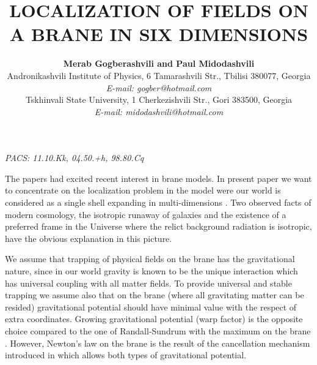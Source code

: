 \documentclass[a4paper,a4paper]{article}
\begin{document}
\title{\large \bf LOCALIZATION OF FIELDS ON A BRANE IN SIX DIMENSIONS}
\author{{\bf Merab Gogberashvili\coordHE{} and Paul Midodashvili\coordHE{}} \\
\coordHE{} Andronikashvili Institute of Physics, 6 Tamarashvili Str.,
Tbilisi 380077, Georgia \\
{\sl E-mail: gogber@hotmail.com }\\
\coordHE{} Tskhinvali State University, 1 Cherkezishvili Str.,
Gori 383500, Georgia \\
{\sl E-mail: midodashvili@hotmail.com } }
\maketitle
\begin{abstract}
\end{abstract}
\vskip 0.3cm {\sl PACS: 11.10.Kk, 04.50.+h, 98.80.Cq}
\vskip 0.5cm

The papers \cite{ADD,RaSu,G1} had excited recent interest in brane
models. In present paper we want to concentrate on the 
localization problem in the model were our world is considered as
a single shell expanding in multi-dimensions
\cite{G2,G3,G4,G5,GoMi}. Two observed facts of modern cosmology,
the isotropic runaway of galaxies and the existence of a preferred
frame in the Universe where the relict background radiation is
isotropic, have the obvious explanation in this picture.

We assume that trapping of physical fields on the brane has the
gravitational nature, since in our world gravity is known to be
the unique interaction which has universal coupling with all
matter fields. To provide universal and stable trapping we assume
also that on the brane (where all gravitating matter can be
resided) gravitational potential should have minimal value with
the respect of extra coordinates. Growing gravitational potential
(warp factor) is the opposite choice compared to the one of
Randall-Sundrum with the maximum on the brane \cite{RaSu}.
However, Newton's law on the brane is the result of the
cancellation mechanism introduced in \cite{G1,G4} which allows
both types of gravitational potential.
\end{document}
